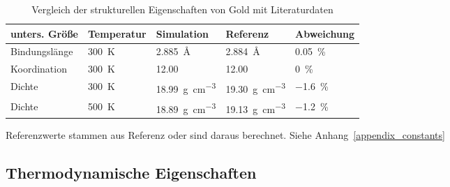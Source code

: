 \begin{table}[t]
  \begin{threeparttable}
  \oddrowcolors
  \caption[Vergleich der strukturellen Eigenschaften von Gold mit Literaturdaten]{
    Vergleich der strukturellen Eigenschaften von Gold mit Literaturdaten\cite{haynes_crc_2011}
  }
  \label{tab:goldpreresults}
  \begin{tabularx}{\textwidth}{|lXXXX|}
    \hline
    \textbf{unters. Größe} & \textbf{Temperatur} & \textbf{Simulation}                     & \textbf{Referenz}\tnote{a}              & \textbf{Abweichung} \\
    \hline
    Bindungslänge          & \SI{300}{\kelvin}   & \SI{2.885}{\angstrom}                   & \SI{2.884}{\angstrom}                   & \SI{0.05}{\percent} \\
    Koordination           & \SI{300}{\kelvin}   & \SI{12.00}{}                            & \SI{12.00}{}                            & \SI{0}{\percent}    \\
    Dichte                 & \SI{300}{\kelvin}   & \SI{18.99}{\gram\per\cubic\centi\meter} & \SI{19.30}{\gram\per\cubic\centi\meter} & \SI{-1.6}{\percent} \\
    Dichte                 & \SI{500}{\kelvin}   & \SI{18.89}{\gram\per\cubic\centi\meter} & \SI{19.13}{\gram\per\cubic\centi\meter} & \SI{-1.2}{\percent} \\
    \hline
  \end{tabularx}
  \begin{tablenotes}
    \item[a] Referenzwerte stammen aus Referenz\cite{haynes_crc_2011} oder sind daraus berechnet.
      Siehe Anhang~\ref{appendix_constants}
  \end{tablenotes}
  \end{threeparttable}
\end{table}

\subsection{Thermodynamische Eigenschaften}
\label{goldthermo}

